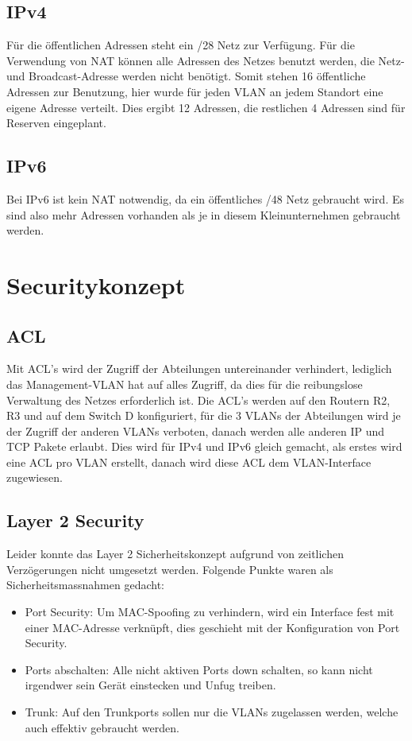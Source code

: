 \documentclass[11pt,a4paper]{scrreprt}
\begin{document}
\subsection{IPv4}
Für die öffentlichen Adressen steht ein /28 Netz zur Verfügung. Für die Verwendung von \acs{NAT} können alle Adressen des Netzes benutzt werden, die Netz- und Broadcast-Adresse werden nicht benötigt. Somit stehen 16 öffentliche Adressen zur Benutzung, hier wurde für jeden \acs{VLAN} an jedem Standort eine eigene Adresse verteilt. Dies ergibt 12 Adressen, die restlichen 4 Adressen sind für Reserven eingeplant.

\subsection{IPv6}
Bei IPv6 ist kein \acs{NAT} notwendig, da ein öffentliches /48 Netz gebraucht wird. Es sind also mehr Adressen vorhanden als je in diesem Kleinunternehmen gebraucht werden.

\newpage
\section{Securitykonzept} 
\subsection{ACL} \label{acl}
Mit \acs{ACL}'s wird der Zugriff der Abteilungen untereinander verhindert, lediglich das Management-\acs{VLAN} hat auf alles Zugriff, da dies für die reibungslose Verwaltung des Netzes erforderlich ist.
Die \acs{ACL}'s werden auf den Routern R2, R3 und auf dem Switch D konfiguriert, für die 3 \acs{VLAN}s der Abteilungen wird je der Zugriff der anderen \acs{VLAN}s verboten, danach werden alle anderen IP und TCP Pakete erlaubt. Dies wird für IPv4 und IPv6 gleich gemacht, als erstes wird eine ACL pro \acs{VLAN} erstellt, danach wird diese \acs{ACL} dem \acs{VLAN}-Interface zugewiesen.

\subsection{Layer 2 Security}
Leider konnte das Layer 2 Sicherheitskonzept aufgrund von zeitlichen Verzögerungen nicht umgesetzt werden. Folgende Punkte waren als Sicherheitsmassnahmen gedacht: 
\begin{itemize}
\item Port Security: Um MAC-Spoofing zu verhindern, wird ein Interface fest mit einer MAC-Adresse verknüpft, dies geschieht mit der Konfiguration von Port Security.
\item Ports abschalten: Alle nicht aktiven Ports down schalten, so kann nicht irgendwer sein Gerät einstecken und Unfug treiben.
\item Trunk: Auf den Trunkports sollen nur die \acs{VLAN}s zugelassen werden, welche auch effektiv gebraucht werden.
\end{itemize}
\end{document}
